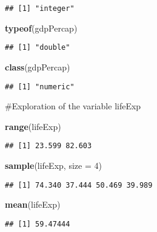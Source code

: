 \documentclass[]{article}
\newenvironment{Shaded}{\begin{snugshade}}{\end{snugshade}}
\newcommand{\DataTypeTok}[1]{\textcolor[rgb]{0.13,0.29,0.53}{#1}}
\newcommand{\DecValTok}[1]{\textcolor[rgb]{0.00,0.00,0.81}{#1}}
\newcommand{\KeywordTok}[1]{\textcolor[rgb]{0.13,0.29,0.53}{\textbf{#1}}}
\newcommand{\NormalTok}[1]{#1}
\begin{document}
\begin{verbatim}
## [1] "integer"
\end{verbatim}

\begin{Shaded}
\begin{Highlighting}[]
\KeywordTok{typeof}\NormalTok{(gdpPercap)}
\end{Highlighting}
\end{Shaded}

\begin{verbatim}
## [1] "double"
\end{verbatim}

\begin{Shaded}
\begin{Highlighting}[]
\KeywordTok{class}\NormalTok{(gdpPercap)}
\end{Highlighting}
\end{Shaded}

\begin{verbatim}
## [1] "numeric"
\end{verbatim}

\#Exploration of the variable lifeExp

\begin{Shaded}
\begin{Highlighting}[]
\KeywordTok{range}\NormalTok{(lifeExp)}
\end{Highlighting}
\end{Shaded}

\begin{verbatim}
## [1] 23.599 82.603
\end{verbatim}

\begin{Shaded}
\begin{Highlighting}[]
\KeywordTok{sample}\NormalTok{(lifeExp, }\DataTypeTok{size =} \DecValTok{4}\NormalTok{)}
\end{Highlighting}
\end{Shaded}

\begin{verbatim}
## [1] 74.340 37.444 50.469 39.989
\end{verbatim}

\begin{Shaded}
\begin{Highlighting}[]
\KeywordTok{mean}\NormalTok{(lifeExp)}
\end{Highlighting}
\end{Shaded}

\begin{verbatim}
## [1] 59.47444
\end{verbatim}
\end{document}
